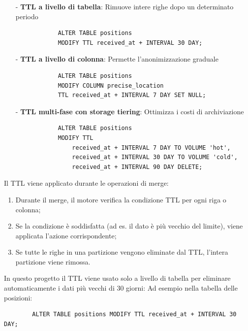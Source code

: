 \documentclass[10pt]{article}
\begin{document}
        \begin{itemize}
            \item[-] \textbf{TTL a livello di tabella}: Rimuove intere righe dopo un determinato periodo
            \begin{lstlisting}
            ALTER TABLE positions
            MODIFY TTL received_at + INTERVAL 30 DAY;
            \end{lstlisting}

            \item[-] \textbf{TTL a livello di colonna}: Permette l'anonimizzazione graduale
            \begin{lstlisting}
            ALTER TABLE positions
            MODIFY COLUMN precise_location
            TTL received_at + INTERVAL 7 DAY SET NULL;
            \end{lstlisting}

            \item[-] \textbf{TTL multi-fase con storage tiering}: Ottimizza i costi di archiviazione
            \begin{lstlisting}
            ALTER TABLE positions
            MODIFY TTL
                received_at + INTERVAL 7 DAY TO VOLUME 'hot',
                received_at + INTERVAL 30 DAY TO VOLUME 'cold',
                received_at + INTERVAL 90 DAY DELETE;
            \end{lstlisting}
        \end{itemize}

        Il TTL viene applicato durante le operazioni di merge:
        \begin{enumerate}
            \item Durante il merge, il motore verifica la condizione TTL per ogni riga o colonna;
            \item Se la condizione è soddisfatta (ad es. il dato è più vecchio del limite), viene applicata l'azione corrispondente;
            \item Se tutte le righe in una partizione vengono eliminate dal TTL, l'intera partizione viene rimossa.
        \end{enumerate}

        In questo progetto il TTL viene usato solo a livello di tabella per eliminare automaticamente i dati più vecchi di 30 giorni:
        Ad esempio nella tabella delle posizioni:
        \begin{lstlisting}
        ALTER TABLE positions MODIFY TTL received_at + INTERVAL 30 DAY;
        \end{lstlisting}
\end{document}
